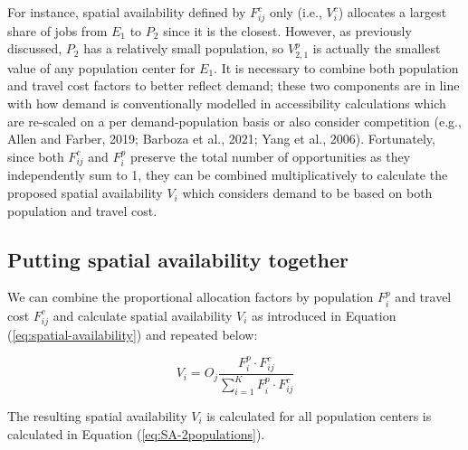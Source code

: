 \documentclass[]{elsarticle} %
\begin{document}
For instance, spatial availability defined by \(F^c_{ij}\) only (i.e.,
\(V^c_{i}\)) allocates a largest share of jobs from \(E_1\) to \(P_2\)
since it is the closest. However, as previously discussed, \(P_2\) has a
relatively small population, so \(V^p_{2,1}\) is actually the smallest
value of any population center for \(E_1\). It is necessary to combine
both population and travel cost factors to better reflect demand; these
two components are in line with how demand is conventionally modelled in
accessibility calculations which are re-scaled on a per
demand-population basis or also consider competition (e.g., Allen and
Farber, 2019; Barboza et al., 2021; Yang et al., 2006). Fortunately,
since both \(F^c_{ij}\) and \(F^p_{i}\) preserve the total number of
opportunities as they independently sum to 1, they can be combined
multiplicatively to calculate the proposed spatial availability
\(V_{i}\) which considers demand to be based on both population and
travel cost.

\hypertarget{putting-spatial-availability-together}{%
\subsection{Putting spatial availability
together}\label{putting-spatial-availability-together}}

We can combine the proportional allocation factors by population
\(F^p_{i}\) and travel cost \(F^c_{ij}\) and calculate spatial
availability \(V_{i}\) as introduced in Equation
(\ref{eq:spatial-availability}) and repeated below:

\[
V_{i} = O_j\frac{F^p_{i} \cdot F^c_{ij}}{\sum_{i=1}^K F^p_{i} \cdot F^c_{ij}}
\]

The resulting spatial availability \(V_{i}\) is calculated for all
population centers is calculated in Equation (\ref{eq:SA-2populations}).
\end{document}

